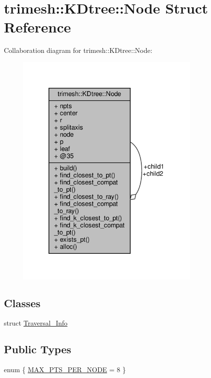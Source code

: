\hypertarget{structtrimesh_1_1KDtree_1_1Node}{}\section{trimesh\+:\+:K\+Dtree\+:\+:Node Struct Reference}
\label{structtrimesh_1_1KDtree_1_1Node}


Collaboration diagram for trimesh\+:\+:K\+Dtree\+:\+:Node\+:\nopagebreak
\begin{figure}[H]
\begin{center}
\leavevmode
\includegraphics[width=259pt]{d1/dff/structtrimesh_1_1KDtree_1_1Node__coll__graph}
\end{center}
\end{figure}
\subsection*{Classes}
\begin{DoxyCompactItemize}
\item 
struct \hyperlink{structtrimesh_1_1KDtree_1_1Node_1_1Traversal__Info}{Traversal\+\_\+\+Info}
\end{DoxyCompactItemize}
\subsection*{Public Types}
\begin{DoxyCompactItemize}
\item 
enum \{ \hyperlink{structtrimesh_1_1KDtree_1_1Node_aea4a79e439e356d170a52dbb9d369fd5a3b052d5faa949e7df63472f40af97624}{M\+A\+X\+\_\+\+P\+T\+S\+\_\+\+P\+E\+R\+\_\+\+N\+O\+DE} = 8
 \}
\end{DoxyCompactItemize}
